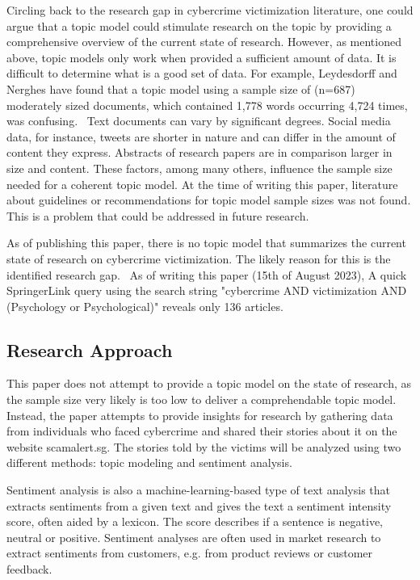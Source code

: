 Circling back to the research gap in cybercrime victimization literature, one could argue that a topic model could stimulate research on the topic by providing a comprehensive overview of the current state of research. However, as mentioned above, topic models only work when provided a sufficient amount of data. It is difficult to determine what is a good set of data. For example, Leydesdorff and Nerghes have found that a topic model using a sample size of (n=687) moderately sized documents, which contained 1,778 words occurring 4,724 times, was confusing.~\citep{leydesdorff2017co} Text documents can vary by significant degrees. Social media data, for instance, tweets are shorter in nature and can differ in the amount of content they express. Abstracts of research papers are in comparison larger in size and content. These factors, among many others, influence the sample size needed for a coherent topic model. At the time of writing this paper, literature about guidelines or recommendations for topic model sample sizes was not found. This is a problem that could be addressed in future research.

\bigskip

As of publishing this paper, there is no topic model that summarizes the current state of research on cybercrime victimization. The likely reason for this is the identified research gap.~\citep{horesearch} As of writing this paper (15th of August 2023), A quick SpringerLink query using the search string "cybercrime AND victimization AND (Psychology or Psychological)" reveals only 136 articles.

\subsection*{Research Approach}

This paper does not attempt to provide a topic model on the state of research, as the sample size very likely is too low to deliver a comprehendable topic model.
Instead, the paper attempts to provide insights for research by gathering data from individuals who faced cybercrime and shared their stories about it on the website scamalert.sg. The stories told by the victims will be analyzed using two different methods: topic modeling and sentiment analysis.

Sentiment analysis is also a machine-learning-based type of text analysis that extracts sentiments from a given text and gives the text a sentiment intensity score, often aided by a lexicon. The score describes if a sentence is negative, neutral or positive. Sentiment analyses are often used in market research to extract sentiments from customers, e.g. from product reviews or customer feedback.~\cite{rambocas2013marketing}

